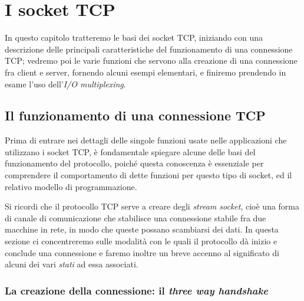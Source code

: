 
\chapter{I socket TCP}
\label{cha:TCP_socket}

In questo capitolo tratteremo le basi dei socket TCP, iniziando con una
descrizione delle principali caratteristiche del funzionamento di una
connessione TCP; vedremo poi le varie funzioni che servono alla creazione di
una connessione fra client e server, fornendo alcuni esempi elementari, e
finiremo prendendo in esame l'uso dell'\textit{I/O multiplexing}.


\section{Il funzionamento di una connessione TCP}
\label{sec:TCP_connession}

Prima di entrare nei dettagli delle singole funzioni usate nelle applicazioni
che utilizzano i socket TCP, è fondamentale spiegare alcune delle basi del
funzionamento del protocollo, poiché questa conoscenza è essenziale per
comprendere il comportamento di dette funzioni per questo tipo di socket, ed
il relativo modello di programmazione.

Si ricordi che il protocollo TCP serve a creare degli \textit{stream socket},
cioè una forma di canale di comunicazione che stabilisce una connessione
stabile fra due macchine in rete, in modo che queste possano scambiarsi dei
dati. In questa sezione ci concentreremo sulle modalità con le quali il
protocollo dà inizio e conclude una connessione e faremo inoltre un breve
accenno al significato di alcuni dei vari \textsl{stati} ad essa associati.


\subsection{La creazione della connessione: il \textit{three way handshake}}
\label{sec:TCP_conn_cre}

